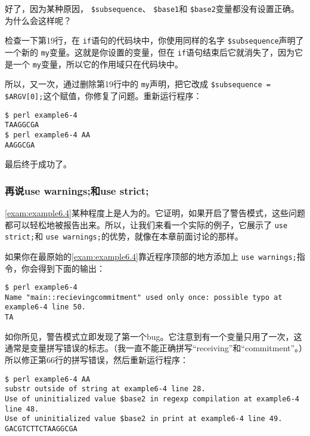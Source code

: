 好了，因为某种原因， \verb|$subsequence|、 \verb|$base1|和 \verb|$base2|变量都没有设置正确。为什么会这样呢？

检查一下第19行，在 \verb|if|语句的代码块中，你使用同样的名字 \verb|$subsequence|声明了一个新的 \verb|my|变量。这就是你设置的变量，但在 \verb|if|语句结束后它就消失了，因为它是一个 \verb|my|变量，所以它的作用域只在代码块中。

所以，又一次，通过删除第19行中的 \verb|my|声明，把它改成 \verb|$subsequence = $ARGV[0];|这个赋值，你修复了问题。重新运行程序：

\begin{lstlisting}
$ perl example6-4
TAAGGCGA
$ perl example6-4 AA
AAGGCGA 
\end{lstlisting}

最后终于成功了。

\subsubsection{再说use warnings;和use strict;}
\autoref{exam:example6.4}某种程度上是人为的。它证明，如果开启了警告模式，这些问题都可以轻松地被报告出来。所以，让我们来看一个实际的例子，它展示了
\verb|use strict;|和 \verb|use warnings;|的优势，就像在本章前面讨论的那样。

如果你在最原始的\autoref{exam:example6.4}靠近程序顶部的地方添加上 \verb|use warnings;|指令，你会得到下面的输出：

\begin{lstlisting}
$ perl example6-4 
Name "main::recievingcommitment" used only once: possible typo at example6-4 line 50.
TA 
\end{lstlisting}

如你所见，警告模式立即发现了第一个bug。它注意到有一个变量只用了一次，这通常是变量拼写错误的标志。（我一直不能正确拼写“receiving”和“commitment”。）所以修正第66行的拼写错误，然后重新运行程序：

\begin{lstlisting}
$ perl example6-4 AA
substr outside of string at example6-4 line 28.
Use of uninitialized value $base2 in regexp compilation at example6-4 line 48.
Use of uninitialized value $base2 in print at example6-4 line 49.
GACGTCTTCTAAGGCGA
\end{lstlisting}

